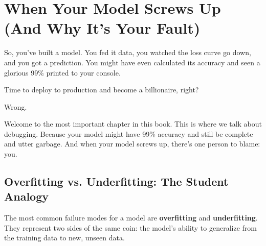 \documentclass[11pt, letterpaper, openany]{book}
\begin{document}
\chapter{When Your Model Screws Up (And Why It’s Your Fault)}

So, you've built a model. You fed it data, you watched the loss curve go down, and you got a prediction. You might have even calculated its accuracy and seen a glorious 99\% printed to your console.

Time to deploy to production and become a billionaire, right?

Wrong.

Welcome to the most important chapter in this book. This is where we talk about debugging. Because your model might have 99\% accuracy and still be complete and utter garbage. And when your model screws up, there's one person to blame: you.

\section{Overfitting vs. Underfitting: The Student Analogy}

The most common failure modes for a model are \textbf{overfitting} and \textbf{underfitting}. They represent two sides of the same coin: the model's ability to generalize from the training data to new, unseen data.
\end{document}
